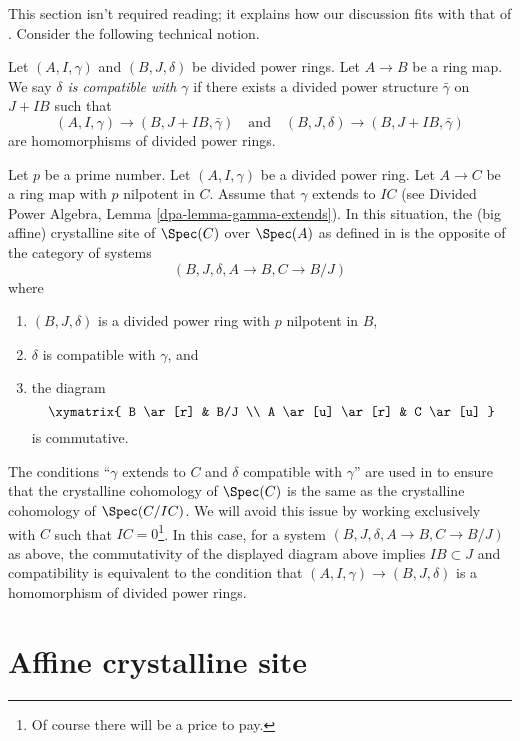 \noindent
This section isn't required reading; it explains how our discussion
fits with that of \cite{Berthelot}.
Consider the following technical notion.

\begin{definition}
\label{definition-compatible}
Let $(A, I, \gamma)$ and $(B, J, \delta)$ be divided power rings.
Let $A \to B$ be a ring map. We say
{\it $\delta$ is compatible with $\gamma$}
if there exists a divided power structure $\bar\gamma$ on
$J + IB$ such that
$$
(A, I, \gamma) \to (B, J + IB, \bar \gamma)\quad\text{and}\quad
(B, J, \delta) \to (B, J + IB, \bar \gamma)
$$
are homomorphisms of divided power rings.
\end{definition}

\noindent
Let $p$ be a prime number. Let $(A, I, \gamma)$ be a divided power ring.
Let $A \to C$ be a ring map with $p$ nilpotent in $C$.
Assume that $\gamma$ extends to $IC$ (see
Divided Power Algebra, Lemma \ref{dpa-lemma-gamma-extends}).
In this situation, the (big affine) crystalline site of
$\Spec(C)$ over $\Spec(A)$
as defined in \cite{Berthelot} 
is the opposite of the category of systems
$$
(B, J, \delta, A \to B, C \to B/J)
$$
where
\begin{enumerate}
\item $(B, J, \delta)$ is a divided power ring with $p$ nilpotent in $B$,
\item $\delta$ is compatible with $\gamma$, and
\item the diagram
$$
\xymatrix{
B \ar[r] & B/J \\
A \ar[u] \ar[r] & C \ar[u]
}
$$
is commutative.
\end{enumerate}
The conditions
``$\gamma$ extends to $C$ and $\delta$ compatible with $\gamma$''
are used in \cite{Berthelot} to ensure that
the crystalline cohomology of $\Spec(C)$ is the same as the crystalline
cohomology of $\Spec(C/IC)$. We will avoid this issue
by working exclusively with $C$ such that $IC = 0$\footnote{Of course there
will be a price to pay.}. In this case,
for a system $(B, J, \delta, A \to B, C \to B/J)$ as above,
the commutativity of the displayed diagram above implies $IB \subset J$ and
compatibility is equivalent to the condition that
$(A, I, \gamma) \to (B, J, \delta)$ is a homomorphism of divided
power rings.




\section{Affine crystalline site}
\label{section-affine-site}

